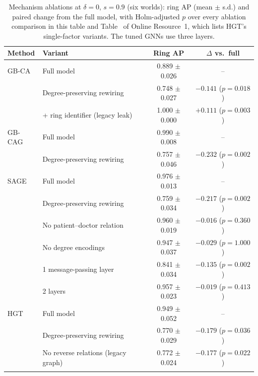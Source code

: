 \begin{table}[h]
\caption{Mechanism ablations at $\delta=0$, $s=0.9$ (six worlds): ring AP (mean $\pm$ s.d.) and paired change from the full model, with Holm-adjusted $p$ over every ablation comparison in this table and Table~\STabHGT{} of Online Resource~1, which lists HGT's single-factor variants. The tuned GNNs use three layers.}\label{tab:ablation}
\scriptsize
\begin{tabular}{@{}llcc@{}}
\toprule
Method & Variant & Ring AP & $\Delta$ vs.\ full \\
\midrule
GB-CA & Full model & 0.889 $\pm$ 0.026 & -- \\
 & Degree-preserving rewiring & 0.748 $\pm$ 0.027 & $-0.141$ ($p=0.018$) \\
 & + ring identifier (legacy leak) & 1.000 $\pm$ 0.000 & $+0.111$ ($p=0.003$) \\
\midrule
GB-CAG & Full model & 0.990 $\pm$ 0.008 & -- \\
 & Degree-preserving rewiring & 0.757 $\pm$ 0.046 & $-0.232$ ($p=0.002$) \\
\midrule
SAGE & Full model & 0.976 $\pm$ 0.013 & -- \\
 & Degree-preserving rewiring & 0.759 $\pm$ 0.034 & $-0.217$ ($p=0.002$) \\
 & No patient--doctor relation & 0.960 $\pm$ 0.019 & $-0.016$ ($p=0.360$) \\
 & No degree encodings & 0.947 $\pm$ 0.037 & $-0.029$ ($p=1.000$) \\
 & 1 message-passing layer & 0.841 $\pm$ 0.034 & $-0.135$ ($p=0.002$) \\
 & 2 layers & 0.957 $\pm$ 0.023 & $-0.019$ ($p=0.413$) \\
\midrule
HGT & Full model & 0.949 $\pm$ 0.052 & -- \\
 & Degree-preserving rewiring & 0.770 $\pm$ 0.029 & $-0.179$ ($p=0.036$) \\
 & No reverse relations (legacy graph) & 0.772 $\pm$ 0.024 & $-0.177$ ($p=0.022$) \\
\botrule
\end{tabular}
\end{table}